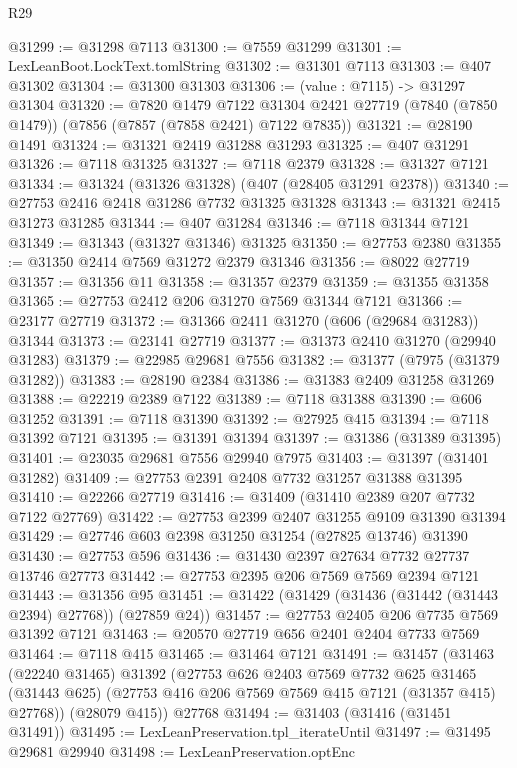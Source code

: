 \begin{lexlean}{R29}
\begin{coremodule}
@31299 := @31298 @7113
@31300 := @7559 @31299
@31301 := LexLeanBoot.LockText.tomlString
@31302 := @31301 @7113
@31303 := @407 @31302
@31304 := @31300 @31303
@31306 := (value : @7115) -> @31297 @31304
@31320 := @7820
    @1479
    @7122
    @31304
    @2421
    @27719
    (@7840 (@7850 @1479))
    (@7856 (@7857 (@7858 @2421) @7122 @7835))
@31321 := @28190 @1491
@31324 := @31321 @2419 @31288 @31293
@31325 := @407 @31291
@31326 := @7118 @31325
@31327 := @7118 @2379
@31328 := @31327 @7121
@31334 := @31324 (@31326 @31328) (@407 (@28405 @31291 @2378))
@31340 := @27753 @2416 @2418 @31286 @7732 @31325 @31328
@31343 := @31321 @2415 @31273 @31285
@31344 := @407 @31284
@31346 := @7118 @31344 @7121
@31349 := @31343 (@31327 @31346) @31325
@31350 := @27753 @2380
@31355 := @31350 @2414 @7569 @31272 @2379 @31346
@31356 := @8022 @27719
@31357 := @31356 @11
@31358 := @31357 @2379
@31359 := @31355 @31358
@31365 := @27753 @2412 @206 @31270 @7569 @31344 @7121
@31366 := @23177 @27719
@31372 := @31366 @2411 @31270 (@606 (@29684 @31283)) @31344
@31373 := @23141 @27719
@31377 := @31373 @2410 @31270 (@29940 @31283)
@31379 := @22985 @29681 @7556
@31382 := @31377 (@7975 (@31379 @31282))
@31383 := @28190 @2384
@31386 := @31383 @2409 @31258 @31269
@31388 := @22219 @2389 @7122
@31389 := @7118 @31388
@31390 := @606 @31252
@31391 := @7118 @31390
@31392 := @27925 @415
@31394 := @7118 @31392 @7121
@31395 := @31391 @31394
@31397 := @31386 (@31389 @31395)
@31401 := @23035 @29681 @7556 @29940 @7975
@31403 := @31397 (@31401 @31282)
@31409 := @27753 @2391 @2408 @7732 @31257 @31388 @31395
@31410 := @22266 @27719
@31416 := @31409 (@31410 @2389 @207 @7732 @7122 @27769)
@31422 := @27753 @2399 @2407 @31255 @9109 @31390 @31394
@31429 := @27746 @603 @2398 @31250 @31254 (@27825 @13746) @31390
@31430 := @27753 @596
@31436 := @31430 @2397 @27634 @7732 @27737 @13746 @27773
@31442 := @27753 @2395 @206 @7569 @7569 @2394 @7121
@31443 := @31356 @95
@31451 := @31422 (@31429 (@31436 (@31442 (@31443 @2394) @27768)) (@27859 @24))
@31457 := @27753 @2405 @206 @7735 @7569 @31392 @7121
@31463 := @20570 @27719 @656 @2401 @2404 @7733 @7569
@31464 := @7118 @415
@31465 := @31464 @7121
@31491 := @31457
    (@31463
      (@22240 @31465)
      @31392
      (@27753
        @626
        @2403
        @7569
        @7732
        @625
        @31465
        (@31443 @625)
        (@27753 @416 @206 @7569 @7569 @415 @7121 (@31357 @415) @27768))
      (@28079 @415))
    @27768
@31494 := @31403 (@31416 (@31451 @31491))
@31495 := LexLeanPreservation.tpl_iterateUntil
@31497 := @31495 @29681 @29940
@31498 := LexLeanPreservation.optEnc

\end{coremodule}
\end{lexlean}
